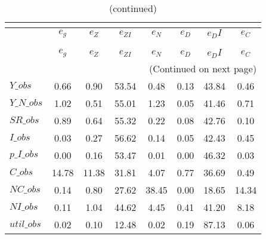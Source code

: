  
\begin{center}
\begin{longtable}{lccccccc} 
\caption{VARIANCE DECOMPOSITION (in percent)}\\
 \label{Table:th_var_decomp_uncond}\\
\toprule 
$           $	 & 	 $       {e_g}$	 & 	 $       {e_Z}$	 & 	 $    {e_{ZI}}$	 & 	 $       {e_N}$	 & 	 $       {e_D}$	 & 	 $      {e_DI}$	 & 	 $       {e_C}$\\
\midrule \endfirsthead 
\caption{(continued)}\\
 \toprule \\ 
$           $	 & 	 $       {e_g}$	 & 	 $       {e_Z}$	 & 	 $    {e_{ZI}}$	 & 	 $       {e_N}$	 & 	 $       {e_D}$	 & 	 $      {e_DI}$	 & 	 $       {e_C}$\\
\midrule \endhead 
\midrule \multicolumn{8}{r}{(Continued on next page)} \\ \bottomrule \endfoot 
\bottomrule \endlastfoot 
$Y\_obs     $	 & 	        0.66	 & 	        0.90	 & 	       53.54	 & 	        0.48	 & 	        0.13	 & 	       43.84	 & 	        0.46 \\ 
$Y\_N\_obs  $	 & 	        1.02	 & 	        0.51	 & 	       55.01	 & 	        1.23	 & 	        0.05	 & 	       41.46	 & 	        0.71 \\ 
$SR\_obs    $	 & 	        0.89	 & 	        0.64	 & 	       55.32	 & 	        0.22	 & 	        0.08	 & 	       42.76	 & 	        0.10 \\ 
$I\_obs     $	 & 	        0.03	 & 	        0.27	 & 	       56.62	 & 	        0.14	 & 	        0.05	 & 	       42.43	 & 	        0.45 \\ 
$p\_I\_obs  $	 & 	        0.00	 & 	        0.16	 & 	       53.47	 & 	        0.01	 & 	        0.00	 & 	       46.32	 & 	        0.03 \\ 
$C\_obs     $	 & 	       14.78	 & 	       11.38	 & 	       31.81	 & 	        4.07	 & 	        0.77	 & 	       36.69	 & 	        0.49 \\ 
$NC\_obs    $	 & 	        0.14	 & 	        0.80	 & 	       27.62	 & 	       38.45	 & 	        0.00	 & 	       18.65	 & 	       14.34 \\ 
$NI\_obs    $	 & 	        0.11	 & 	        1.04	 & 	       44.62	 & 	        4.45	 & 	        0.41	 & 	       41.20	 & 	        8.18 \\ 
$util\_obs  $	 & 	        0.02	 & 	        0.10	 & 	       12.48	 & 	        0.02	 & 	        0.19	 & 	       87.13	 & 	        0.06 \\ 

\end{longtable}
\end{center}
